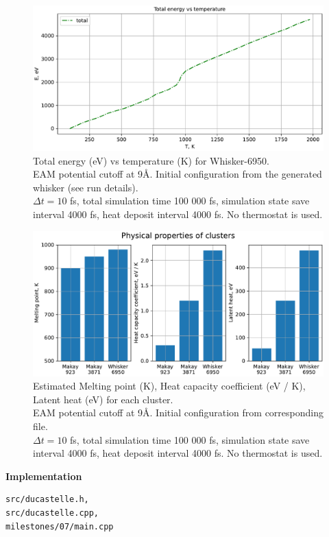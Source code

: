 \documentclass[12pt,a4paper]{article}
\begin{document}
\begin{figure}[h!]
	\centering
	\includegraphics[width=.95\linewidth]{img/milestone07-whisker.pdf}
	\caption{Total energy (eV) vs temperature (K) for Whisker-6950.\\
	EAM potential cutoff at 9Å. Initial configuration from the generated whisker (see run details).\\
	$\Delta t = 10$ fs, total simulation time 100 000 fs, simulation state save interval 4000 fs, heat deposit interval 4000 fs.
	No thermostat is used.}
	\label{fig:heat-whisker}
\end{figure}

\begin{figure}[h!]
	\centering
	\includegraphics[width=.9\linewidth]{img/milestone07-bar.pdf}
	\caption{Estimated Melting point (K), Heat capacity coefficient (eV / K), Latent heat (eV) for each cluster.\\
	EAM potential cutoff at 9Å. Initial configuration from corresponding file.\\
	$\Delta t = 10$ fs, total simulation time 100 000 fs, simulation state save interval 4000 fs, heat deposit interval 4000 fs.
	No thermostat is used.}
	\label{fig:heat-estimated}
\end{figure}

\newpage

{\bf Implementation}
\begin{lstlisting}[breaklines]
src/ducastelle.h,
src/ducastelle.cpp,
milestones/07/main.cpp
\end{lstlisting}
\end{document}
